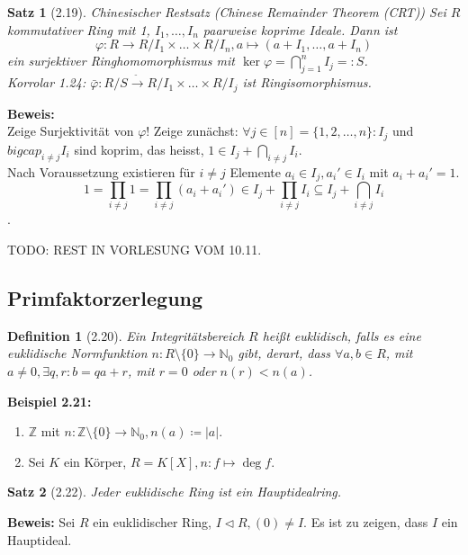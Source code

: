 \documentclass[10pt,a4paper]{article}
\newtheorem{defi}{Definition}
\newtheorem{satz}{Satz}
\begin{document}
\begin{satz}[2.19]{Chinesischer Restsatz (Chinese Remainder Theorem (CRT))}
Sei $R$ kommutativer Ring mit 1, $I_1, \dots, I_n$ paarweise koprime Ideale. Dann ist
$$\varphi : R \rightarrow R/I_1 \times \dots \times R/I_n, a \mapsto (a + I_1, \dots, a + I_n)$$
ein surjektiver Ringhomomorphismus mit $\ker \varphi = \bigcap_{j=1}^n I_j =: S$.\\
Korrolar 1.24: $\bar \varphi : R/S \overset{\tilde{ }}{\rightarrow} R/I_1 \times \dots \times R/I_j$ ist Ringisomorphismus.
\end{satz}
\textbf{Beweis:}\\
Zeige Surjektivität von $\varphi$! Zeige zunächst: $\forall j \in [n] = \lbrace 1, 2,  \dots, n\rbrace: I_j$ und $bigcap_{i \neq j} I_i$ sind koprim, das heisst, $1 \in I_j + \bigcap_{i \neq j} I_i$.\\
Nach Voraussetzung existieren für $i \neq j$ Elemente $a_i \in I_j, a_i' \in I_i$ mit $a_i + a_i' = 1$.\\
$$1 = \prod_{i \neq j} 1 = \prod_{i \neq j} (a_i + a_i') \in I_j + \prod_{i \neq j} I_i \subseteq I_j + \bigcap_{i \neq j} I_i$$.


 TODO: REST IN VORLESUNG VOM 10.11.

\subsection{Primfaktorzerlegung}

\begin{defi}[2.20]
Ein Integritätsbereich $R$ heißt \emph{euklidisch}, falls es eine \emph{euklidische Normfunktion} $n: R\setminus\{0\} \to \mathbb{N}_0$ gibt, derart, dass $\forall a, b \in R$, mit $a \neq 0, \exists q, r : b = q a + r$, mit $r = 0$ oder $n(r) < n(a)$.
\end{defi}

\textbf{Beispiel 2.21:}\begin{enumerate}
\item $\mathbb{Z}$ mit $n : \mathbb{Z} \setminus \{0\} \to \mathbb{N}_0, n(a) \coloneqq \vert a \vert$.
\item Sei $K$ ein Körper, $R=K[X], n : f \mapsto \deg f$.
\end{enumerate}

\begin{satz}[2.22]
Jeder euklidische Ring ist ein Hauptidealring.
\end{satz}
\textbf{Beweis:} Sei $R$ ein euklidischer Ring, $I \triangleleft R, (0) \neq I$. Es ist zu zeigen, dass $I$ ein Hauptideal.
\end{document}
